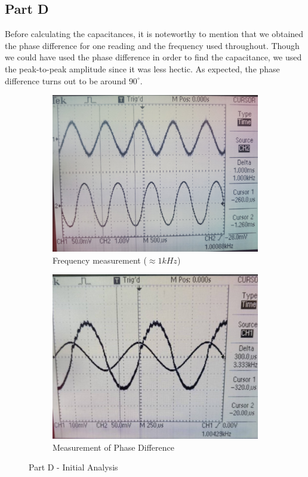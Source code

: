 \documentclass[12pt]{article}
\begin{document}
\subsection{Part D}
Before calculating the capacitances, it is noteworthy to mention that we obtained the phase difference for one reading and the frequency used throughout. Though we could have used the phase difference in order to find the capacitance, we used the peak-to-peak amplitude since it was less hectic. As expected, the phase difference turns out to be around \( 90^{\circ} \).
\begin{figure}[H]
	\centering
	\begin{subfigure}[b]{0.475\linewidth}
		\centering
		\includegraphics[width = \linewidth, trim = {0 0 0 0}, clip]{PartD_FreqMeasure.jpg}
		\caption{Frequency measurement (\( \approx 1kHz \))}
	\end{subfigure}
	\begin{subfigure}[b]{0.475\linewidth}
		\centering
		\includegraphics[width = \linewidth, trim = {0 0 0 0}, clip]{PartD_PhaseDiff.jpg}
		\caption{Measurement of Phase Difference}
	\end{subfigure}
	\caption{Part D - Initial Analysis}
\end{figure}
\end{document}
